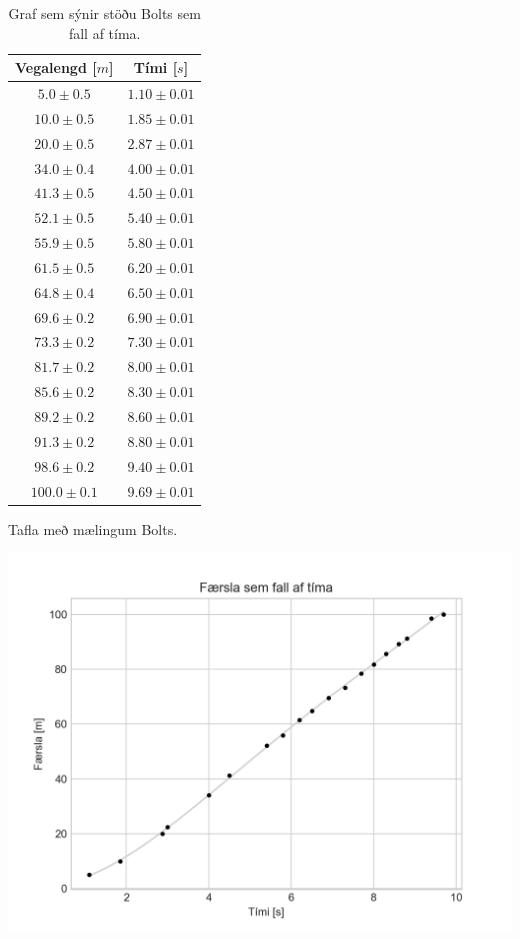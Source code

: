 \ifdefined \wholebook \else\documentclass[oneside]{book}\usepackage{EdlBook}\graphicspath{{figures/}}
\begin{document}
\begin{table}[H]
\begin{minipage}[b]{0.38\linewidth}
\centering
\begin{tabular}{|c|c|}
\hline
\textbf{Vegalengd} [$\si{m}$] & \textbf{Tími} [$\si{s}$]\\
\hline
$5.0 \pm 0.5$ & $1.10 \pm 0.01$  \\
$10.0 \pm 0.5$ & $1.85 \pm 0.01$  \\
$20.0 \pm 0.5$ & $2.87 \pm 0.01$  \\
$34.0 \pm 0.4$ & $4.00 \pm 0.01$   \\
$41.3 \pm 0.5$ & $4.50 \pm 0.01$  \\
$52.1 \pm 0.5$ & $5.40 \pm 0.01$  \\
$55.9 \pm 0.5$ & $5.80 \pm 0.01$    \\
$61.5 \pm 0.5$ & $6.20 \pm 0.01$  \\
$64.8 \pm 0.4$ & $6.50 \pm 0.01$   \\
$69.6 \pm 0.2$ & $6.90 \pm 0.01$   \\
$73.3 \pm 0.2$ & $7.30 \pm 0.01$ \\
$81.7 \pm 0.2$ & $8.00 \pm 0.01$   \\
$85.6 \pm 0.2$ & $8.30 \pm 0.01$   \\
$89.2 \pm 0.2$ & $8.60 \pm 0.01$ \\
$91.3 \pm 0.2$ & $8.80 \pm 0.01$ \\
$98.6 \pm 0.2$ & $9.40 \pm 0.01$ \\
$100.0 \pm 0.1$ & $9.69 \pm 0.01$ \\
\hline
\end{tabular}
\label{tafla:usain1}
\caption{Tafla með mælingum Bolts.}
\end{minipage}\hfill
\begin{minipage}[b]{0.6\linewidth}
\centering
\includegraphics[scale = 0.6]{images/plot_1.png}
\caption{Graf sem sýnir stöðu Bolts sem fall af tíma.}
\label{fig:bolt1}
\end{minipage}
\end{table}
\end{document}

